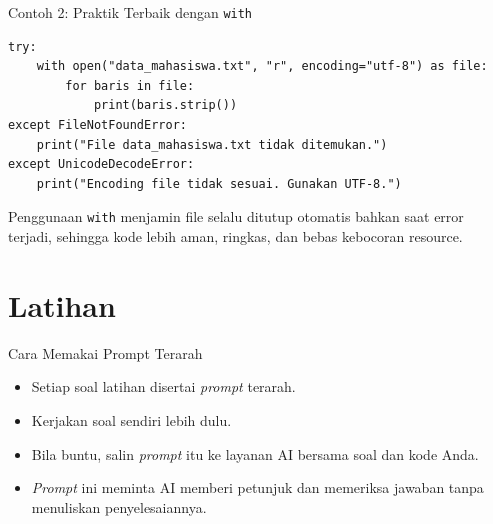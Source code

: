 \documentclass[aspectratio=169, table]{beamer}
\begin{document}
\begin{frame}[fragile]{Contoh 2: Praktik Terbaik dengan \texttt{with}}
\vspace{20pt}
\begin{lstlisting}[style=PythonStyle]
try:
    with open("data_mahasiswa.txt", "r", encoding="utf-8") as file:
        for baris in file:
            print(baris.strip())
except FileNotFoundError:
    print("File data_mahasiswa.txt tidak ditemukan.")
except UnicodeDecodeError:
    print("Encoding file tidak sesuai. Gunakan UTF-8.")
\end{lstlisting}

\noindent
Penggunaan \texttt{with} menjamin file selalu ditutup otomatis bahkan saat error terjadi, 
sehingga kode lebih aman, ringkas, dan bebas kebocoran resource.
\end{frame}


\section{Latihan}
\begin{frame}{Cara Memakai Prompt Terarah}
\begin{itemize}
\item Setiap soal latihan disertai \textit{prompt} terarah.
\item Kerjakan soal sendiri lebih dulu.
\item Bila buntu, salin \textit{prompt} itu ke layanan AI bersama soal dan kode Anda.
\item \textit{Prompt} ini meminta AI memberi petunjuk dan memeriksa jawaban tanpa menuliskan penyelesaiannya.
\end{itemize}
\end{frame}
\end{document}
